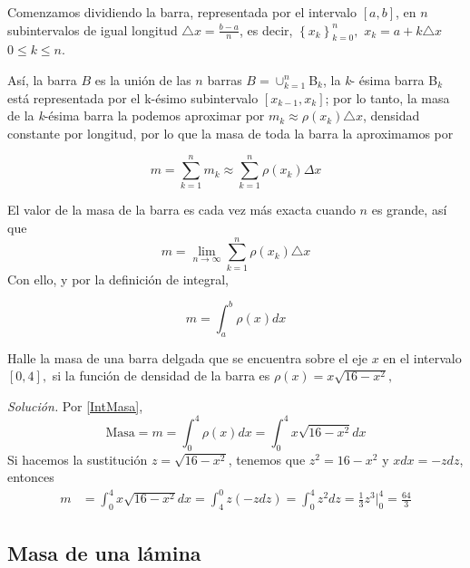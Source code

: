 
Comenzamos dividiendo la barra, representada por el intervalo $\left[ a,b%
\right] $, en $n$ subintervalos de igual longitud $\triangle x=\frac{b-a}{n}$, es decir, $\left\{ x_{k}\right\} _{k=0}^{n},$ $x_{k}=a+k\triangle x$ \ $0\leq k\leq n$.

Así, la barra $B$ es la unión de las $n$ barras $B=\cup _{k=1}^{n}$B$_{k}$, la \textit{k}-%
ésima barra B$_k$ está representada por el k-ésimo
subintervalo $\left[ x_{k-1},x_{k}\right] $; por lo tanto, la masa de la \textit{k}-ésima barra la podemos aproximar por $m_{k}\approx \rho \left( x_{k}\right)
\triangle x$, densidad constante por longitud, por lo que la masa de toda la barra la aproximamos por

\[
m=\sum_{k=1}^{n}m_{k}\approx \sum_{k=1}^{n}\rho \left( x_{k}\right)\Delta x
\]

El valor de la masa de la barra es cada vez más exacta cuando $n$ es grande,
así que
\[
m=\lim_{n\rightarrow \infty }\sum_{k=1}^{n}\rho \left( x_{k}\right)
\triangle x
\]
Con ello, y por la definición de integral,

\begin{equation}\label{IntMasa}
m=\int_{a}^{b}\rho \left( x\right) dx
\end{equation}

\begin{ejemplo} Halle la masa de una barra delgada que se encuentra sobre el eje $x$
en el intervalo $\left[ 0,4\right] ,$ si la función de densidad de la
barra es {\small $\rho \left( x\right) =x\sqrt{16-x^{2}},$}
\end{ejemplo}

\textit{Solución.} Por \eqref{IntMasa},
\[
\text{Masa}=m=\int_{0}^{4}\rho \left( x\right) dx=\int_{0}^{4}x\sqrt{16-x^{2}}dx
\]
Si hacemos la sustitución {\small $z=\sqrt{16-x^{2}}$}, tenemos que $z^{2}=16-x^{2}$ y $xdx=-zdz$, entonces
\begin{align*}
m&=\int_{0}^{4}x\sqrt{16-x^{2}}dx=\int_{4}^{0}z\left( -zdz\right)=\int_{0}^{4}z^{2}dz=\frac{1}{3}z^{3}\Big\vert _{0}^{4} =\frac{64}{3}
\end{align*}

\subsection*{Masa de una lámina}

